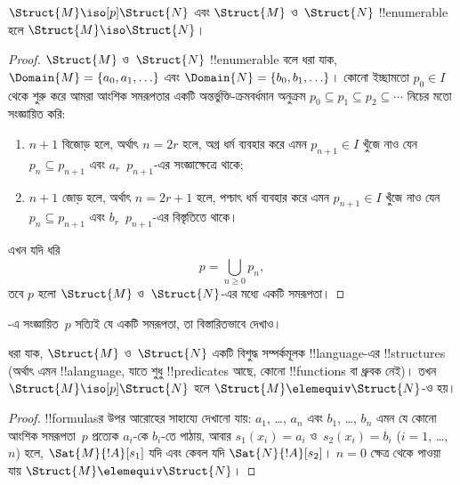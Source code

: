 \documentclass[../../../include/open-logic-section]{subfiles}
\begin{document}
\begin{thm}
  $\Struct{M} \iso[p] \Struct{N}$ এবং $\Struct{M}$ ও~$\Struct{N}$
  !!{enumerable} হলে $\Struct{M} \iso \Struct{N}$।
\end{thm}

\begin{proof}
  $\Struct{M}$ ও~$\Struct{N}$ !!{enumerable} বলে ধরা যাক,
  $\Domain{M} = \{a_0, a_1, \ldots \}$ এবং $\Domain{N} = \{b_0,
  b_1, \ldots \}$। কোনো ইচ্ছামতো $p_0 \in I$ থেকে শুরু করে আমরা
  আংশিক সমরূপতার একটি অন্তর্ভুক্তি-ক্রমবর্ধমান অনুক্রম $p_0 \subseteq
  p_1 \subseteq p_2 \subseteq \cdots$ নিচের মতো সংজ্ঞায়িত করি:
  \begin{enumerate}
  \item $n+1$ বিজোড় হলে, অর্থাৎ $n = 2r$ হলে, অগ্র ধর্ম ব্যবহার করে
    এমন $p_{n+1} \in I$ খুঁজে নাও যেন $p_n \subseteq p_{n+1}$ এবং
    $a_r$~$p_{n+1}$-এর সংজ্ঞাক্ষেত্রে থাকে;
  \item $n+1$ জোড় হলে, অর্থাৎ $n = 2r+1$ হলে, পশ্চাৎ ধর্ম ব্যবহার করে
    এমন $p_{n+1} \in I$ খুঁজে নাও যেন $p_n \subseteq p_{n+1}$ এবং
    $b_r$~$p_{n+1}$-এর বিস্তৃতিতে থাকে।
  \end{enumerate}
এখন যদি ধরি
\[
p = \bigcup_{n\ge 0} p_n,
\]
তবে $p$ হলো $\Struct{M}$ ও~$\Struct{N}$-এর মধ্যে একটি সমরূপতা।
\end{proof}

\begin{prob}
  -এ সংজ্ঞায়িত~$p$ সত্যিই যে একটি
  সমরূপতা, তা বিস্তারিতভাবে দেখাও।
\end{prob}

\begin{thm}
  ধরা যাক, $\Struct{M}$ ও~$\Struct{N}$ একটি বিশুদ্ধ সম্পর্কমূলক
  !!{language}-এর !!{structure}s (অর্থাৎ এমন !!a{language}, যাতে শুধু
  !!{predicate}s আছে, কোনো !!{function}s বা ধ্রুবক নেই)। তখন
  $\Struct{M} \iso[p] \Struct{N}$ হলে $\Struct{M} \elemequiv
  \Struct{N}$-ও হয়।
\end{thm}

\begin{proof}
  !!{formula}sর উপর আরোহের সাহায্যে দেখানো যায়: $a_1$, \dots, $a_n$
  এবং $b_1$, \dots, $b_n$ এমন যে কোনো আংশিক সমরূপতা~$p$ প্রত্যেক
  $a_i$-কে $b_i$-তে পাঠায়, আবার $s_1(x_i) =a_i$ ও~$s_2(x_i) =b_i$
  ($i =1$, \dots,~$n$) হলে, $\Sat{M}{!A}[s_1]$ যদি এবং কেবল যদি
  $\Sat{N}{!A}[s_2]$। $n=0$ ক্ষেত্র থেকে পাওয়া যায়
  $\Struct{M} \elemequiv \Struct{N}$।
\end{proof}
\end{document}
